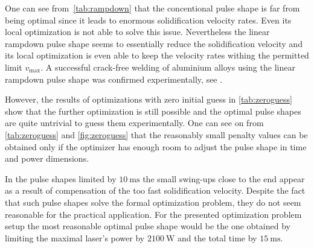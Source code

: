One can see from~\cref{tab:rampdown} that the concentional pulse shape is far from being optimal since it leads to enormous solidification velocity rates. Even its local optimization is not able to solve this issue. Nevertheless the linear rampdown pulse shape seems to essentially reduce the solidification velocity and its local optimization is even able to keep the velocity rates withing the permitted limit $v_{\max}$. A successful crack-free welding of aluminium alloys using the linear rampdown pulse shape was confirmed experimentally, see \cite{ZhangWeckmanZhou:2008:1,JiaZhangYuShiLiuWuYeWangTian:2021:1}.

However, the results of optimizations with zero initial guess in \cref{tab:zeroguess} show that the further optimization is still possible and the optimal pulse shapes are quite untrivial to guess them experimentally. One can see on from \cref{tab:zeroguess} and \cref{fig:zeroguess} that the reasonably small penalty values can be obtained only if the optimizer has enough room to adjust the pulse shape in time and power dimensions.

In the pulse shapes limited by $\SI{10}{\ms}$ the small swing-ups close to the end appear as a result of compensation of the too fast solidification velocity. Despite the fact that such pulse shapes solve the formal optimization problem, they do not seem reasonable for the practical application. For the presented optimization problem setup the most reasonable optimal pulse shape would be the one obtained by limiting the maximal laser's power by $\SI{2100}{\W}$ and the total time by $\SI{15}{\ms}$.
